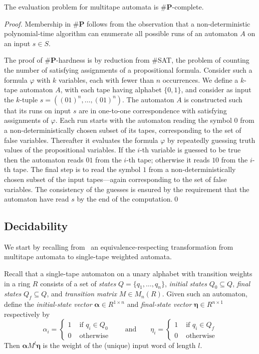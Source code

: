 \documentclass[runningheads]{llncs}
\newcommand{\valpha}{\boldsymbol{\alpha}}
\newcommand{\veta}{\boldsymbol{\eta}}
\begin{document}
\begin{proposition}
The evaluation problem for multitape automata is $\#
\mathbf{P}$-complete.
\end{proposition}
\begin{proof} 
  Membership in $\# \mathbf{P}$ follows from the observation that
  a non-deterministic polynomial-time algorithm can enumerate all
  possible runs of an automaton $A$ on an input $s\in S$.

  The proof of $\# \mathbf{P}$-hardness is by reduction from \#SAT, the
  problem of counting the number of satisfying assignments of a
  propositional formula.  Consider such a formula $\varphi$ with $k$
  variables, each with fewer than $n$ occurrences.  We define a
  $k$-tape automaton $A$, with each tape having alphabet $\{0,1\}$,
  and consider as input the $k$-tuple $s=((01)^n,\ldots,(01)^n)$.  The
  automaton $A$ is constructed such that its runs on input $s$ are in
  one-to-one correspondence with satisfying assignments of $\varphi$.
  Each run starts with the automaton reading the symbol $0$ from a
  non-deterministically chosen subset of its tapes, corresponding to
  the set of false variables.  Thereafter it evaluates the formula
  $\varphi$ by repeatedly guessing truth values of the propositional
  variables.  If the $i$-th variable is guessed to be true then the
  automaton reads $01$ from the $i$-th tape; otherwise it reads $10$
  from the $i$-th tape.  The final step is to read the symbol $1$ from
  a non-deterministically chosen subset of the input tapes---again
  corresponding to the set of false variables.  The consistency of the
  guesses is ensured by the requirement that the automaton have read
  $s$ by the end of the computation.\qed
\end{proof}

\subsection{Decidability}
We start by recalling from~\cite{HarjuK91} an equivalence-respecting
transformation from multitape automata to single-tape weighted
automata.  

Recall that a single-tape automaton on a unary alphabet with
transition weights in a ring $R$ consists of a set of \emph{states}
$Q=\{q_1,\ldots,q_n\}$, \emph{initial states} $Q_0\subseteq Q$,
\emph{final states} $Q_f\subseteq Q$, and \emph{transition matrix} $M
\in M_n(R)$.  Given such an automaton, define the
\emph{initial-state vector} $\valpha \in R^{1\times n}$ and
\emph{final-state vector} $\veta \in R^{n\times 1}$ respectively by
\[ \alpha_i = \left\{  \begin{array}{ll}
                    1 & \mbox{ if $q_i \in Q_0$}\\
                    0 & \mbox{ otherwise}
\end{array} \right . \qquad \mbox{and} \qquad 
   \eta_i = \left\{  \begin{array}{ll}
                    1 & \mbox{ if $q_i \in Q_f$} \\
                    0 & \mbox{ otherwise}
\end{array}\right . \]
Then $\valpha M^l \veta$ is the weight of the (unique) input word of
length $l$.
\end{document}
